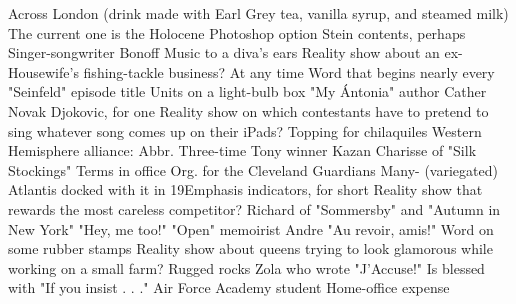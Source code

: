 \begin{clues}{Across}
     London {\blank} (drink made with Earl Grey tea, vanilla syrup, and steamed milk)
     The current one is the Holocene
     Photoshop option
     Stein contents, perhaps
     Singer-songwriter Bonoff
     Music to a diva's ears
     Reality show about an ex-Housewife's fishing-tackle business?
     At any time
     Word that begins nearly every "Seinfeld" episode title
     Units on a light-bulb box
     "My Ántonia" author Cather
     Novak Djokovic, for one
     Reality show on which contestants have to pretend to sing whatever song comes up on their iPads?
     Topping for chilaquiles
     Western Hemisphere alliance: Abbr.
     Three-time Tony winner Kazan
     Charisse of "Silk Stockings"
     Terms in office
     Org. for the Cleveland Guardians
     Many-{\blank} (variegated)
     Atlantis docked with it in 19Emphasis indicators, for short
     Reality show that rewards the most careless competitor?
     Richard of "Sommersby" and "Autumn in New York"
     "Hey, me too!"
     "Open" memoirist Andre
     "Au revoir, {\blank} amis!"
     Word on some rubber stamps
     Reality show about queens trying to look glamorous while working on a small farm?
     Rugged rocks
     Zola who wrote "J'Accuse!"
     Is blessed with
     "If you insist . . ."
     Air Force Academy student
     Home-office expense
\end{clues}
\vspace{\cluesep}
